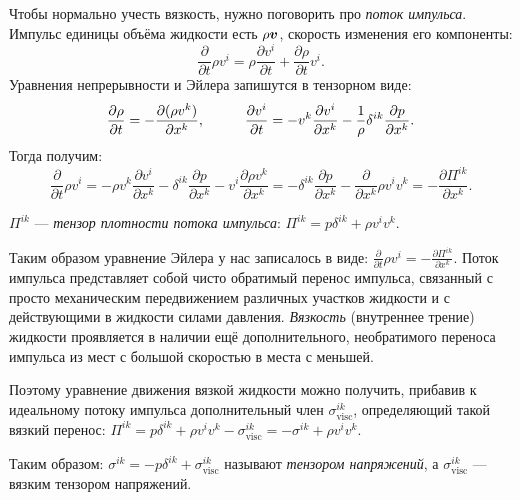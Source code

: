 Чтобы нормально учесть вязкость, нужно поговорить про \textit{поток импульса}.
Импульс единицы объёма жидкости есть $\rho \mbox{\boldmath $v$}$, скорость изменения его компоненты:
\begin{equation*}
	\frac{\partial}{\partial t} \rho v^i = \rho \frac{\partial v^i}{\partial t} + \frac{\partial \rho}{\partial t} v^i.
\end{equation*}
Уравнения непрерывности и Эйлера запишутся в тензорном виде:
\begin{equation*}
	\frac{\partial \rho}{\partial t} = - \frac{\partial (\rho v^k)}{\partial x^k},
	\hspace*{0.5 cm}
	\hspace*{0.5 cm}
	\frac{\partial v^i}{\partial t} = - v^k \frac{\partial v^i}{\partial x^k} - \frac{1}{\rho} \delta^{i k} \frac{\partial p}{\partial x^k}.
\end{equation*}
Тогда получим:
\begin{equation*}
	\frac{\partial}{\partial t} \rho v^i 
	= 
	- \rho v^k \frac{\partial v^i}{\partial x^k} -  \delta^{i k} \frac{\partial p}{\partial x^k} - v^i \frac{\partial \rho v^k}{\partial x^k} 
	=
	-\delta^{i k} \frac{\partial p}{\partial x^k} - \frac{\partial}{\partial x^k} \rho v^i v^k
	= - \frac{\partial \Pi^{i k}}{\partial x^k}.
\end{equation*}
\begin{to_def}
	$\Pi^{i k} $ --- \textit{тензор плотности потока импульса}:
	$
		\Pi^{i k} = p \delta^{i k} + \rho v^i v^k.
	$
\end{to_def}

Таким образом уравнение Эйлера у нас записалось в виде:
$
	\frac{\partial}{\partial t} \rho v^i = - \frac{\partial \Pi^{i k}}{\partial x^k}.
$
Поток импульса представляет собой чисто обратимый перенос импульса, связанный с просто механическим передвижением различных участков жидкости и с действующими в жидкости силами давления.
\textit{Вязкость} (внутреннее трение) жидкости проявляется в наличии ещё дополнительного, необратимого переноса импульса из мест с большой скоростью в места с меньшей.

Поэтому уравнение движения вязкой жидкости можно получить, прибавив к идеальному потоку импульса дополнительный член $\sigma^{i k}_{\text{visc}}$, определяющий такой вязкий перенос:
$
\Pi^{i k} = p \delta^{i k} + \rho v^i v^k - \sigma^{i k}_{\text{visc}} = - \sigma^{i k} + \rho v^i v^k.
$
\begin{to_def}
	Таким образом: $\sigma^{i k} = - p \delta^{i k} + \sigma^{i k}_{\text{visc}}$ называют \textit{тензором напряжений}, а $\sigma^{i k}_{\text{visc}}$ --- вязким тензором напряжений.
\end{to_def}

